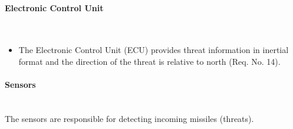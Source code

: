 \paragraph{Electronic Control Unit}\mbox{}\\
\begin{itemize}
\item The Electronic Control Unit (ECU) provides threat information in inertial format and the direction of the threat is relative to north (Req. No. 14).
\end{itemize}

\paragraph{Sensors}\mbox{}\\
The sensors are responsible for detecting incoming missiles (threats).